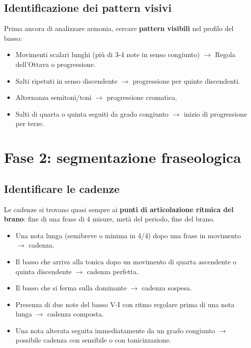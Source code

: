 \subsection{Identificazione dei pattern visivi}

Prima ancora di analizzare armonia, cercare \textbf{pattern visibili} nel profilo del basso:
\begin{itemize}
	\item Movimenti scalari lunghi (più di 3-4 note in senso congiunto) $\rightarrow$ Regola dell'Ottava o progressione.
	\item Salti ripetuti in senso discendente $\rightarrow$ progressione per quinte discendenti.
	\item Alternanza semitoni/toni $\rightarrow$ progressione cromatica.
	\item Salti di quarta o quinta seguiti da grado congiunto $\rightarrow$ inizio di progressione per terze.
\end{itemize}

\section{Fase 2: segmentazione fraseologica}
\label{sec:fase2_basso}

\subsection{Identificare le cadenze}

Le cadenze si trovano quasi sempre ai \textbf{punti di articolazione ritmica del brano}: fine di una frase di 4 misure, metà del periodo, fine del brano.

\begin{regola}
	\label{reg:segnali_cadenza}
	\begin{itemize}
		\item Una nota lunga (semibreve o minima in 4/4) dopo una frase in movimento $\rightarrow$ cadenza.
		\item Il basso che arriva alla tonica dopo un movimento di quarta ascendente o quinta discendente $\rightarrow$ cadenza perfetta.
		\item Il basso che si ferma sulla dominante $\rightarrow$ cadenza sospesa.
		\item Presenza di due note del basso V-I con ritmo regolare prima di una nota lunga $\rightarrow$ cadenza composta.
		\item Una nota alterata seguita immediatamente da un grado congiunto $\rightarrow$ possibile cadenza con sensibile o con tonicizzazione.
	\end{itemize}
\end{regola}


